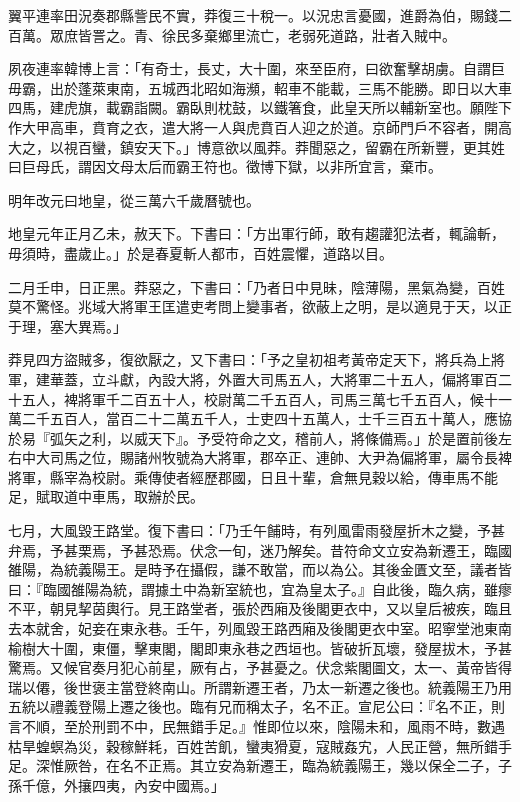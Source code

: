 \begin{pinyinscope}
翼平連率田況奏郡縣訾民不實，莽復三十稅一。以況忠言憂國，進爵為伯，賜錢二百萬。眾庶皆詈之。青、徐民多棄鄉里流亡，老弱死道路，壯者入賊中。

夙夜連率韓博上言：「有奇士，長丈，大十圍，來至臣府，曰欲奮擊胡虜。自謂巨毋霸，出於蓬萊東南，五城西北昭如海瀕，軺車不能載，三馬不能勝。即日以大車四馬，建虎旗，載霸詣闕。霸臥則枕鼓，以鐵箸食，此皇天所以輔新室也。願陛下作大甲高車，賁育之衣，遣大將一人與虎賁百人迎之於道。京師門戶不容者，開高大之，以視百蠻，鎮安天下。」博意欲以風莽。莽聞惡之，留霸在所新豐，更其姓曰巨母氏，謂因文母太后而霸王符也。徵博下獄，以非所宜言，棄市。

明年改元曰地皇，從三萬六千歲曆號也。

地皇元年正月乙未，赦天下。下書曰：「方出軍行師，敢有趨讙犯法者，輒論斬，毋須時，盡歲止。」於是春夏斬人都市，百姓震懼，道路以目。

二月壬申，日正黑。莽惡之，下書曰：「乃者日中見昧，陰薄陽，黑氣為變，百姓莫不驚怪。兆域大將軍王匡遣吏考問上變事者，欲蔽上之明，是以適見于天，以正于理，塞大異焉。」

莽見四方盜賊多，復欲厭之，又下書曰：「予之皇初祖考黃帝定天下，將兵為上將軍，建華蓋，立斗獻，內設大將，外置大司馬五人，大將軍二十五人，偏將軍百二十五人，裨將軍千二百五十人，校尉萬二千五百人，司馬三萬七千五百人，候十一萬二千五百人，當百二十二萬五千人，士吏四十五萬人，士千三百五十萬人，應協於易『弧矢之利，以威天下』。予受符命之文，稽前人，將條備焉。」於是置前後左右中大司馬之位，賜諸州牧號為大將軍，郡卒正、連帥、大尹為偏將軍，屬令長裨將軍，縣宰為校尉。乘傳使者經歷郡國，日且十輩，倉無見穀以給，傳車馬不能足，賦取道中車馬，取辦於民。

七月，大風毀王路堂。復下書曰：「乃壬午餔時，有列風雷雨發屋折木之變，予甚弁焉，予甚栗焉，予甚恐焉。伏念一旬，迷乃解矣。昔符命文立安為新遷王，臨國雒陽，為統義陽王。是時予在攝假，謙不敢當，而以為公。其後金匱文至，議者皆曰：『臨國雒陽為統，謂據土中為新室統也，宜為皇太子。』自此後，臨久病，雖瘳不平，朝見挈茵輿行。見王路堂者，張於西廂及後閣更衣中，又以皇后被疾，臨且去本就舍，妃妾在東永巷。壬午，列風毀王路西廂及後閣更衣中室。昭寧堂池東南榆樹大十圍，東僵，擊東閣，閣即東永巷之西垣也。皆破折瓦壞，發屋拔木，予甚驚焉。又候官奏月犯心前星，厥有占，予甚憂之。伏念紫閣圖文，太一、黃帝皆得瑞以僊，後世褒主當登終南山。所謂新遷王者，乃太一新遷之後也。統義陽王乃用五統以禮義登陽上遷之後也。臨有兄而稱太子，名不正。宣尼公曰：『名不正，則言不順，至於刑罰不中，民無錯手足。』惟即位以來，陰陽未和，風雨不時，數遇枯旱蝗螟為災，穀稼鮮耗，百姓苦飢，蠻夷猾夏，寇賊姦宄，人民正營，無所錯手足。深惟厥咎，在名不正焉。其立安為新遷王，臨為統義陽王，幾以保全二子，子孫千億，外攘四夷，內安中國焉。」


\end{pinyinscope}
